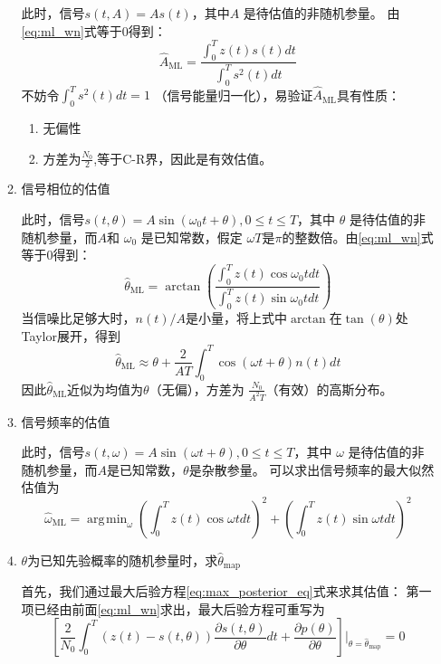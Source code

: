 \documentclass{article}
\def\E{\mathbb{E}}
\DeclareMathOperator*\argmin{\arg\!\min}
\begin{document}
\begin{enumerate}
\begin{enumerate}[label=(\arabic*)]
此时，信号$s(t,A)=As(t)$，其中$A$ 是待估值的非随机参量。
由\eqref{eq:ml_wn}式等于0得到：
$$
\hat{A}_{\mathrm{ML}}=\frac{\int_0^T z(t)s(t)dt}{\int_0^T s^2(t)dt}
$$
不妨令$\int_0^T s^2(t)dt=1$ （信号能量归一化），易验证$\hat{A}_{\mathrm{ML}}$具有性质：
\begin{enumerate}[label=(\alph*)]
\item 无偏性
\item 方差为$\frac{N_0}{2}$,等于C-R界，因此是有效估值。
\end{enumerate}
\item 信号相位的估值

此时，信号$s(t,\theta)=A\sin(\omega_0 t + \theta),0\leq t \leq T$，其中 $\theta$ 是待估值的非随机参量，而$A$和 $\omega_0$ 是已知常数，假定 $\omega T$是$\pi$的整数倍。由\eqref{eq:ml_wn}式等于0得到：
$$
\hat{\theta}_{\mathrm{ML}} = \arctan \left(\frac{\int_0^T z(t)\cos\omega_0 t dt }{\int_0^T z(t)\sin\omega_0 t dt}\right)
$$
当信噪比足够大时，$n(t)/A$是小量，将上式中$\arctan$在$\tan(\theta)$处Taylor展开，得到
$$
\hat{\theta}_{\mathrm{ML}} \approx \theta + \frac{2}{AT} \int_0^T \cos(\omega t + \theta)n(t)dt
$$
因此$\hat{\theta}_{\mathrm{ML}}$近似为均值为$\theta$（无偏），方差为 $\frac{N_0}{A^2T}$（有效）的高斯分布。

\item 信号频率的估值

此时，信号$s(t,\omega)=A\sin(\omega t + \theta),0\leq t \leq T$，其中 $\omega$ 是待估值的非随机参量，而$A$是已知常数，$\theta$是杂散参量。
可以求出信号频率的最大似然估值为
$$
\hat{\omega}_{\mathrm{ML}} = \argmin_{\omega} \left(\int_0^T z(t)\cos\omega t dt \right)^2 + \left(\int_0^T z(t)\sin\omega t dt \right)^2
$$
\item $\theta$为已知先验概率的随机参量时，求$\hat{\theta}_{\mathrm{map}}$

首先，我们通过最大后验方程\eqref{eq:max_posterior_eq}式来求其估值：
第一项已经由前面\eqref{eq:ml_wn}求出，最大后验方程可重写为
\begin{equation}\label{eq:known_prior}
\left[\frac{2}{N_0}\int_0^T  (z(t)-s(t,\theta))\frac{\partial s(t,\theta)}{\partial \theta} dt + \frac{\partial p(\theta)}{\partial \theta} \right]{\bigg\rvert}_{\theta=\hat{\theta}_{\mathrm{map}}}=0
\end{equation}


\end{enumerate}
\end{enumerate}
\end{document}
